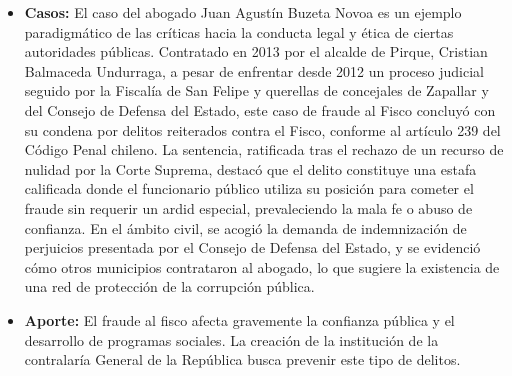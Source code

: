 \documentclass[letter,12pt]{article}
\begin{document}
\begin{itemize}
		\item \textbf{Casos: }El caso del abogado Juan Agustín Buzeta Novoa es un ejemplo paradigmático de las críticas hacia la conducta legal y ética de ciertas autoridades públicas. Contratado en 2013 por el alcalde de Pirque, Cristian Balmaceda Undurraga, a pesar de enfrentar desde 2012 un proceso judicial seguido por la Fiscalía de San Felipe y querellas de concejales de Zapallar y del Consejo de Defensa del Estado, este caso de fraude al Fisco concluyó con su condena por delitos reiterados contra el Fisco, conforme al artículo 239 del Código Penal chileno. La sentencia, ratificada tras el rechazo de un recurso de nulidad por la Corte Suprema, destacó que el delito constituye una estafa calificada donde el funcionario público utiliza su posición para cometer el fraude sin requerir un ardid especial, prevaleciendo la mala fe o abuso de confianza. En el ámbito civil, se acogió la demanda de indemnización de perjuicios presentada por el Consejo de Defensa del Estado, y se evidenció cómo otros municipios contrataron al abogado, lo que sugiere la existencia de una red de protección de la corrupción pública.\cite{fraudealfisco}\\
		
		\item \textbf{Aporte: }El fraude al fisco afecta gravemente la confianza pública y el desarrollo de programas sociales. La creación de la institución de la contralaría General de la República busca prevenir este tipo de delitos.\\
	\end{itemize}
	
\end{document}
